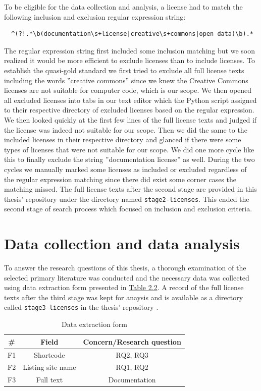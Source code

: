 To be eligible for the data collection and analysis, a license had to match the following inclusion and exclusion regular expression string:
\begin{verbatim}
  ^(?!.*\b(documentation\s+license|creative\s+commons|open data)\b).*
\end{verbatim}

The regular expression string first included some inclusion matching but we soon realized it would be more efficient to exclude licenses than to include licenses. To establish the quasi-gold standard we first tried to exclude all full license texts including the words ''creative commons'' since we knew the Creative Commons licenses are not suitable for computer code, which is our scope. We then opened all excluded licenses into tabs in our text editor which the Python script assigned to their respective directory of excluded licenses based on the regular expression. We then looked quickly at the first few lines of the full license texts and judged if the license was indeed not suitable for our scope. Then we did the same to the included licenses in their respective directory and glanced if there were some types of licenses that were not suitable for our scope. We did one more cycle like this to finally exclude the string ''documentation license'' as well. During the two cycles we manually marked some licenses as included or excluded regardless of the regular expression matching since there did exist some corner cases the matching missed. The full license texts after the second stage are provided in this thesis' repository \citep{mscthesis} under the directory named \texttt{stage2-licenses}. This ended the second stage of search process which focused on inclusion and exclusion criteria.

\section{Data collection and data analysis}
To answer the research questions of this thesis, a thorough examination of the selected primary literature was conducted and the necessary data was collected using data extraction form presented in \hyperref[table:extraction]{Table 2.2}. A record of the full license texts after the third stage was kept for anaysis and is available as a directory called \texttt{stage3-licenses} in the thesis' repository \citep{mscthesis}.

\begin{table}[t]
	\begin{center}
		\begin{tabular}{||c c c||} 
			\hline
			\# & Field & Concern/Research question \\
			\hline
			F1 & Shortcode & RQ2, RQ3 \\
			F2 & Listing site name & RQ1, RQ2 \\
			F3 & Full text &  Documentation\\
			\hline
		\end{tabular}
		\caption{Data extraction form}
		\label{table:extraction}
	\end{center}
\end{table}

